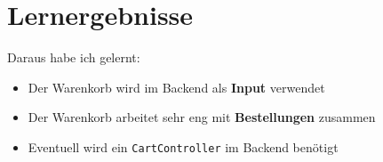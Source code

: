 \documentclass[12pt, a4paper]{scrreprt}
\begin{document}
	\section{Lernergebnisse}
	
	Daraus habe ich gelernt:
	
	\begin{itemize}
		\item Der Warenkorb wird im Backend als \textbf{Input} verwendet
		\item Der Warenkorb arbeitet sehr eng mit \textbf{Bestellungen} zusammen
		\item Eventuell wird ein \texttt{CartController} im Backend benötigt
	\end{itemize}
	
	
\end{document}
